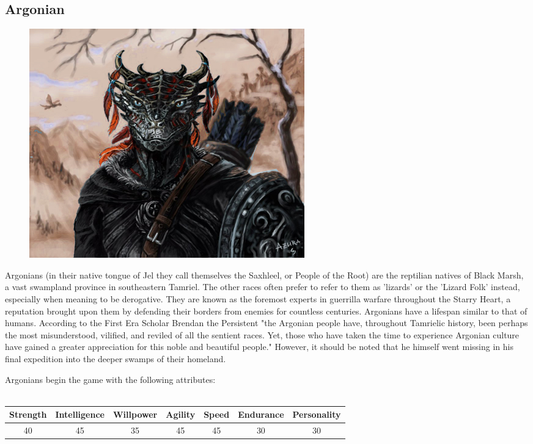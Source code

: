 \documentclass[12pt]{book}
\begin{document}
\subsection{Argonian}
\begin{figure}
	\includegraphics[width=\textwidth]{Argonian.png}
\end{figure}

Argonians (in their native tongue of Jel they call themselves the Saxhleel, or People of the Root) are the reptilian natives of Black Marsh, a vast swampland province in southeastern Tamriel. The other races often prefer to refer to them as 'lizards' or the 'Lizard Folk' instead, especially when meaning to be derogative. They are known as the foremost experts in guerrilla warfare throughout the Starry Heart, a reputation brought upon them by defending their borders from enemies for countless centuries. Argonians have a lifespan similar to that of humans. According to the First Era Scholar Brendan the Persistent "the Argonian people have, throughout Tamrielic history, been perhaps the most misunderstood, vilified, and reviled of all the sentient races. Yet, those who have taken the time to experience Argonian culture have gained a greater appreciation for this noble and beautiful people." However, it should be noted that he himself went missing in his final expedition into the deeper swamps of their homeland.

Argonians begin the game with the following attributes:\\~\\
\begin{tabular}{|c|c|c|c|c|c|c|}
\hline
Strength & Intelligence & Willpower & Agility & Speed & Endurance & Personality\\ \hline
40 & 45 & 35 & 45 & 45 & 30 & 30\\ \hline

\end{tabular}\\
\end{document}
